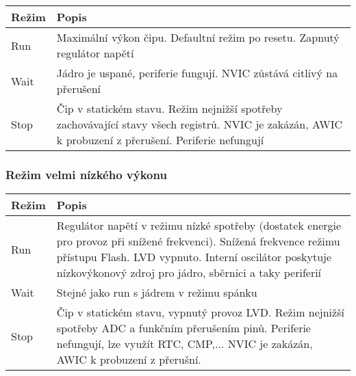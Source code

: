\documentclass{article}
\begin{document}
\begin{tabularx}{\textwidth}{|>{\centering\arraybackslash}p{}|X|}
    \hline
    \textbf{Režim} & \textbf{Popis} \\
    \hline
    Run & Maximální výkon čipu. Defaultní režim po resetu. Zapnutý regulátor
    napětí \\
    \hline
    Wait & Jádro je uspané, periferie fungují. NVIC zůstává citlivý na
    přerušení \\
    \hline
    Stop & Čip v statickém stavu. Režim nejnižší spotřeby zachovávající stavy
    všech registrů. NVIC je zakázán, AWIC k probuzení z přerušení. Periferie
    nefungují \\
    \hline
\end{tabularx}

\subsubsection{Režim velmi nízkého výkonu}

\begin{tabularx}{\textwidth}{|>{\centering\arraybackslash}p{}|X|}
    \hline
    \textbf{Režim} & \textbf{Popis} \\
    \hline
    Run & Regulátor napětí v režimu nízké spotřeby (dostatek energie pro
    provoz při snížené frekvenci). Snížená frekvence režimu přístupu Flash.
    LVD vypnuto. Interní oscilátor poskytuje nízkovýkonový zdroj pro jádro,
    sběrnici a taky periferií \\
    \hline
    Wait & Stejné jako run s jádrem v režimu spánku \\
    \hline
    Stop & Čip v statickém stavu, vypnutý provoz LVD. Režim nejnižší spotřeby
    ADC a funkčním přerušením pinů. Periferie nefungují, lze využít RTC,
    CMP,... NVIC je zakázán, AWIC k probuzení z přerušní. \\
    \hline
\end{tabularx}
\end{document}
